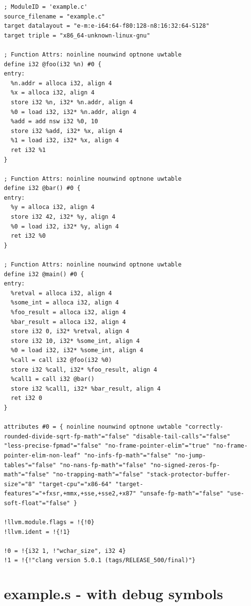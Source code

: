 \documentclass[12pt, twoside]{fithesis2}
\renewcommand{\_}{\leavevmode \kern0.07em\vbox{\hrule width0.4em}}
\begin{document}
\begin{verbatim}
; ModuleID = 'example.c'
source_filename = "example.c"
target datalayout = "e-m:e-i64:64-f80:128-n8:16:32:64-S128"
target triple = "x86_64-unknown-linux-gnu"

; Function Attrs: noinline nounwind optnone uwtable
define i32 @foo(i32 %n) #0 {
entry:
  %n.addr = alloca i32, align 4
  %x = alloca i32, align 4
  store i32 %n, i32* %n.addr, align 4
  %0 = load i32, i32* %n.addr, align 4
  %add = add nsw i32 %0, 10
  store i32 %add, i32* %x, align 4
  %1 = load i32, i32* %x, align 4
  ret i32 %1
}

; Function Attrs: noinline nounwind optnone uwtable
define i32 @bar() #0 {
entry:
  %y = alloca i32, align 4
  store i32 42, i32* %y, align 4
  %0 = load i32, i32* %y, align 4
  ret i32 %0
}

; Function Attrs: noinline nounwind optnone uwtable
define i32 @main() #0 {
entry:
  %retval = alloca i32, align 4
  %some_int = alloca i32, align 4
  %foo_result = alloca i32, align 4
  %bar_result = alloca i32, align 4
  store i32 0, i32* %retval, align 4
  store i32 10, i32* %some_int, align 4
  %0 = load i32, i32* %some_int, align 4
  %call = call i32 @foo(i32 %0)
  store i32 %call, i32* %foo_result, align 4
  %call1 = call i32 @bar()
  store i32 %call1, i32* %bar_result, align 4
  ret i32 0
}

attributes #0 = { noinline nounwind optnone uwtable "correctly-rounded-divide-sqrt-fp-math"="false" "disable-tail-calls"="false" "less-precise-fpmad"="false" "no-frame-pointer-elim"="true" "no-frame-pointer-elim-non-leaf" "no-infs-fp-math"="false" "no-jump-tables"="false" "no-nans-fp-math"="false" "no-signed-zeros-fp-math"="false" "no-trapping-math"="false" "stack-protector-buffer-size"="8" "target-cpu"="x86-64" "target-features"="+fxsr,+mmx,+sse,+sse2,+x87" "unsafe-fp-math"="false" "use-soft-float"="false" }

!llvm.module.flags = !{!0}
!llvm.ident = !{!1}

!0 = !{i32 1, !"wchar_size", i32 4}
!1 = !{!"clang version 5.0.1 (tags/RELEASE_500/final)"}
\end{verbatim}


\chapter{example.s - with debug symbols}
\label{appendix:example_dbg}
\end{document}
